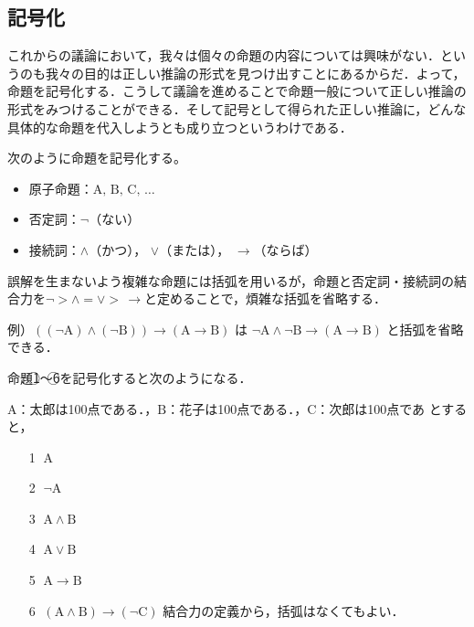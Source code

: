 \documentclass[10pt,b5paper,papersize,dvipdfmx]{jsbook}
\newcommand\rmA{\mathrm{A}}
\newcommand\rmB{\mathrm{B}}
\newcommand\rmC{\mathrm{C}}
\newcommand\maru[1]{\textcircled{\scriptsize{}#1}}
\begin{document}
\subsection{記号化}
これからの議論において，我々は個々の命題の内容については興味がない．というのも我々の目的は正しい推論の形式を見つけ出すことにあるからだ．よって，命題を記号化する．こうして議論を進めることで命題一般について正しい推論の形式をみつけることができる．そして記号として得られた正しい推論に，どんな具体的な命題を代入しようとも成り立つというわけである．\par
次のように命題を記号化する。
\begin{itemize}
  \item 原子命題：$\rmA,\, \rmB,\, \rmC,\, \dots$
  \item 否定詞：$\lnot$（ない）
  \item 接続詞：$\land$（かつ）， $\lor$（または）， $\to$（ならば）
\end{itemize}
誤解を生まないよう複雑な命題には括弧を用いるが，命題と否定詞・接続詞の結合力を$\lnot > \land = \lor > \,\to$と定めることで，煩雑な括弧を省略する．\par
例）$((\lnot \rmA) \land (\lnot \rmB)) \to (\rmA \to \rmB)$ は $\lnot \rmA \land \lnot \rmB \to (\rmA \to \rmB)$ と括弧を省略できる．\par
命題\maru{1}～\maru{6}を記号化すると次のようになる．\par
$\rmA$：太郎は100点である．，$\rmB$：花子は100点である．，$\rmC$：次郎は100点であ
とすると，
\begin{itemize} %
  \item[\maru{1}] $\rmA$
  \item[\maru{2}] $\lnot \rmA$
  \item[\maru{3}] $\rmA \land \rmB$
  \item[\maru{4}] $\rmA \lor \rmB$
  \item[\maru{5}] $\rmA \to \rmB$
  \item[\maru{6}] $(\rmA \land \rmB) \to (\lnot \rmC)$ 結合力の定義から，括弧はなくてもよい．
\end{itemize}
\end{document}
